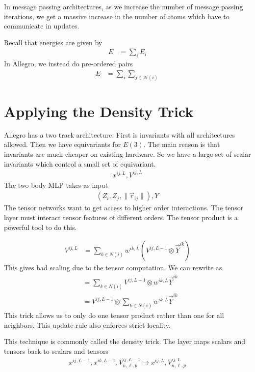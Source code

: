 \documentclass[book.tex]{subfiles}
\begin{document}
In message passing architectures, as we increase the number of message passing iterations, we get a massive increase in the number of atoms which have to communicate in updates.

Recall that energies are given by
\begin{align}
E &= \sum_i E_i
\end{align}
In Allegro, we instead do pre-ordered pairs
\begin{align}
E &= \sum_{i} \sum_{j \in \mathcal{N}(i)} 
\end{align}

\section{Applying the Density Trick}

Allegro has a two track architecture. First is invariants with all architectures allowed. Then we have equivariants for $E(3)$. The main reason is that invariants are much cheaper on existing hardware. So we have a large set of scalar invariants which control a small set of equivariant.
\begin{align}
x^{ij,L}, V^{ij,L}
\end{align}
The two-body MLP takes as input
\begin{align}
(Z_i, Z_j, \|\vec{r}_{ij}\|), Y
\end{align}
The tensor networks want to get access to higher order interactions. The tensor layer must interact tensor features of different orders. The tensor product is a powerful tool to do this.

\begin{align}
V^{ij, L} &= \sum_{k \in N(i)} w^{ik,L} (V^{ij,L-1} \otimes \vec{Y}^{ik})
\end{align}
This gives bad scaling due to the tensor computation. We can rewrite as
\begin{align}
&= \sum_{k \in N(i)} V^{ij,L-1} \otimes w^{ik,L}\vec{Y}^{ik} \\
&= V^{ij,L-1} \otimes \sum_{k \in N(i)} w^{ik,L}\vec{Y}^{ik}
\end{align}
This trick allows us to only do one tensor product rather than one for all neighbors. This update rule also enforces strict locality.


This technique is commonly called the density trick. The layer maps scalars and tensors back to scalars and tensors
\begin{align}
x^{ij,L-1}, x^{ik, L-1}, V^{ij,L-1}_{n,\ell,p} \mapsto x^{ij,L}, V^{ij,L}_{n,\ell,p}
\end{align}
\end{document}
